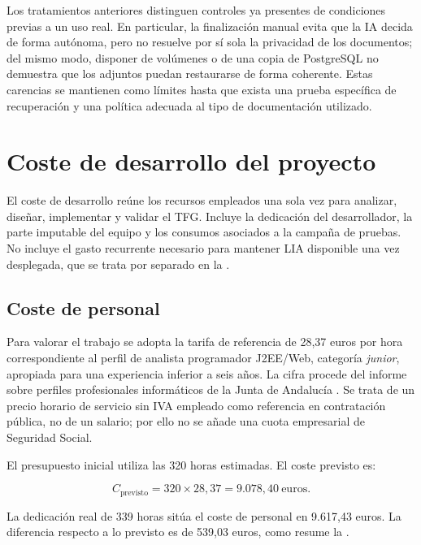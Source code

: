 Los tratamientos anteriores distinguen controles ya presentes de condiciones
previas a un uso real. En particular, la finalización manual evita que la IA
decida de forma autónoma, pero no resuelve por sí sola la privacidad de los
documentos; del mismo modo, disponer de volúmenes o de una copia de PostgreSQL
no demuestra que los adjuntos puedan restaurarse de forma coherente. Estas
carencias se mantienen como límites hasta que exista una prueba específica de
recuperación y una política adecuada al tipo de documentación utilizado.

\section{Coste de desarrollo del proyecto}
\label{sec:development-cost}

El coste de desarrollo reúne los recursos empleados una sola vez para analizar,
diseñar, implementar y validar el TFG. Incluye la dedicación del desarrollador,
la parte imputable del equipo y los consumos asociados a la campaña de pruebas.
No incluye el gasto recurrente necesario para mantener LIA disponible una vez
desplegada, que se trata por separado en la
.

\subsection{Coste de personal}

Para valorar el trabajo se adopta la tarifa de referencia de 28,37 euros por
hora correspondiente al perfil de analista programador J2EE/Web, categoría
\emph{junior}, apropiada para una experiencia inferior a seis años. La cifra
procede del informe sobre perfiles profesionales informáticos de la Junta de
Andalucía \cite{juntaPerfilesInformaticos2018}. Se trata de un precio horario de
servicio sin IVA empleado como referencia en contratación pública, no de un
salario; por ello no se añade una cuota empresarial de Seguridad Social.

El presupuesto inicial utiliza las 320 horas estimadas. El coste previsto
es:

\begin{equation}
  C_{\text{previsto}} = 320 \times 28{,}37 = 9{.}078{,}40~\text{euros}.
\end{equation}

La dedicación real de 339 horas sitúa el coste de personal en 9{.}617,43 euros.
La diferencia respecto a lo previsto es de 539,03 euros, como resume la
.

